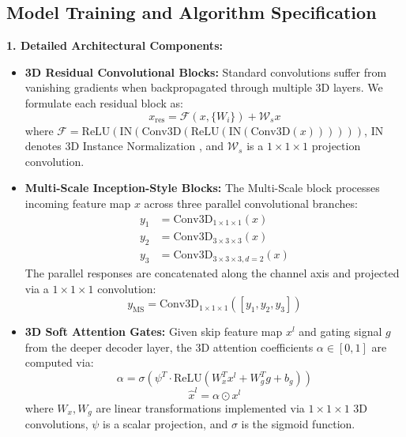 \documentclass[conference]{IEEEtran}
\begin{document}
\subsection{Model Training and Algorithm Specification}
\textbf{1. Detailed Architectural Components:}
\begin{itemize}
    \item \textbf{3D Residual Convolutional Blocks:} Standard convolutions suffer from vanishing gradients when backpropagated through multiple 3D layers. We formulate each residual block as:
    \begin{equation}
    x_{\text{res}} = \mathcal{F}(x, \{W_i\}) + \mathcal{W}_s x
    \end{equation}
    where $\mathcal{F} = \text{ReLU}(\text{IN}(\text{Conv3D}(\text{ReLU}(\text{IN}(\text{Conv3D}(x))))))$, $\text{IN}$ denotes 3D Instance Normalization \cite{ulyanov2016instance}, and $\mathcal{W}_s$ is a $1\times 1\times 1$ projection convolution.
    \item \textbf{Multi-Scale Inception-Style Blocks:} The Multi-Scale block processes incoming feature map $x$ across three parallel convolutional branches:
    \begin{align}
    y_1 &= \text{Conv3D}_{1\times 1\times 1}(x) \\
    y_2 &= \text{Conv3D}_{3\times 3\times 3}(x) \\
    y_3 &= \text{Conv3D}_{3\times 3\times 3, d=2}(x)
    \end{align}
    The parallel responses are concatenated along the channel axis and projected via a $1\times 1\times 1$ convolution:
    \begin{equation}
    y_{\text{MS}} = \text{Conv3D}_{1\times 1\times 1}([y_1, y_2, y_3])
    \end{equation}
    \item \textbf{3D Soft Attention Gates:} Given skip feature map $x^l$ and gating signal $g$ from the deeper decoder layer, the 3D attention coefficients $\alpha \in [0, 1]$ are computed via:
    \begin{equation}
    \alpha = \sigma\left(\psi^T \cdot \text{ReLU}(W_x^T x^l + W_g^T g + b_g)\right)
    \end{equation}
    \begin{equation}
    \hat{x}^l = \alpha \odot x^l
    \end{equation}
    where $W_x, W_g$ are linear transformations implemented via $1\times 1\times 1$ 3D convolutions, $\psi$ is a scalar projection, and $\sigma$ is the sigmoid function.
\end{itemize}
\end{document}
